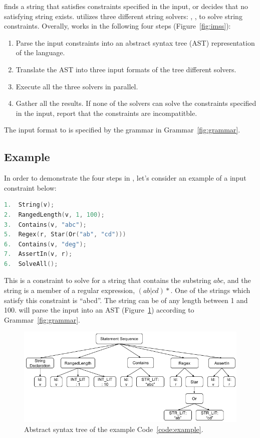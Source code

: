 \imss finds a string that satisfies constraints specified in the input,
or decides that no satisfying string exists. \imss utilizes three different
string solvers: , ,  to solve string
constraints. Overally, \imss works in the following four steps (Figure~\ref{fig:imss}):
\begin{enumerate}
    \item Parse the input constraints into an abstract syntax tree (AST)
    representation of the \imss language.
    \item Translate the AST into three input formats of the tree different solvers.
    \item Execute all the three solvers in parallel.
    \item Gather all the results. If none of the solvers can solve the constraints
    specified in the input, report that the constraints are incompatitble.
\end{enumerate}
The input format to \imss is specified by the grammar in Grammar~\ref{fig:grammar}.

\subsection{Example}

In order to demonstrate the four steps in \imss, let's consider an example of a input constraint
below:
\renewcommand\lstlistingname{Code}
\begin{lstlisting}[label={code:example},frame=bt,numbers=none,basicstyle=\ttfamily\scriptsize,
language=C,captionpos=b,caption={Input constraint in \imss format}]
1.  String(v);
2.  RangedLength(v, 1, 100);
3.  Contains(v, "abc");
5.  Regex(r, Star(Or("ab", "cd")))
6.  Contains(v, "deg");
7.  AssertIn(v, r);
6.  SolveAll();
\end{lstlisting}
This is a constraint to solve for a string that contains the substring $abc$, and
the string is a member of a regular expression, $(ab|cd)*$.
One of the strings which satisfy this constraint is ``abcd''. The string can be of any length
between 1 and 100. \imss will parse the input into an AST (Figure~\ref{fig:exp-ast}) according to Grammar~\ref{fig:grammar}.

\begin{figure}
    \centering
    \includegraphics[scale=0.65]{example-ast}
    \caption{\label{fig:exp-ast}Abstract syntax tree of the example Code~\ref{code:example}.}
\end{figure}

